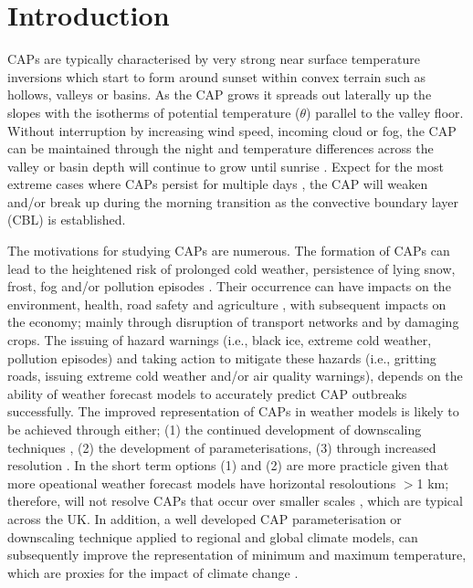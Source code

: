 \documentclass[times]{qjrms4}
\begin{document}

\maketitle

\section{Introduction}
CAPs are typically characterised by very strong near surface temperature inversions which start to form around sunset within convex terrain such as hollows, valleys or basins. As the CAP grows it spreads out laterally up the slopes with the isotherms of potential temperature ($\theta$) parallel to the valley floor. Without interruption by increasing wind speed, incoming cloud or fog, the CAP can be maintained through the night and temperature differences across the valley or basin depth will continue to grow until sunrise \citep{gustavssonetal1998}. Expect for the most extreme cases where CAPs persist for multiple days \citep{whiteman2001cold}, the CAP will weaken and/or break up during the morning transition as the convective boundary layer (CBL) is established.

The motivations for studying CAPs are numerous. The formation of CAPs can lead to the heightened risk of prolonged cold weather, persistence of lying snow, frost, fog and/or pollution episodes \citep{lareauetal2013persist}.  Their occurrence can have impacts on the environment, health, road safety \citep{bogren2000local} and agriculture \citep{lindkvistetal2000,madelin2005spatial}, with subsequent impacts on the economy; mainly through disruption of transport networks and by damaging crops. The issuing of hazard warnings (i.e., black ice, extreme cold weather, pollution episodes) and taking action to mitigate these hazards (i.e., gritting roads, issuing extreme cold weather and/or air quality warnings), depends on the ability of weather forecast models to accurately predict CAP outbreaks successfully. The improved representation of CAPs in weather models is likely to be achieved through either; (1) the continued development of downscaling techniques \citep{pozdnoukhov2009data,sheridan2013characteristics}, (2) the development of parameterisations, (3) through increased resolution \citep{vosper2013high,hughes2015assessment}. In the short term options (1) and (2) are more practicle given that more opeational weather forecast models have horizontal resoloutions $>$1 km; therefore, will not resolve CAPs that occur over smaller scales \citep{vosper2013high}, which are typical across the UK. In addition, a well developed CAP parameterisation or downscaling technique applied to regional and global climate models, can subsequently improve the representation of minimum and maximum temperature, which are proxies for the impact of climate change \citep{daly2010local}.
	
\end{document}
